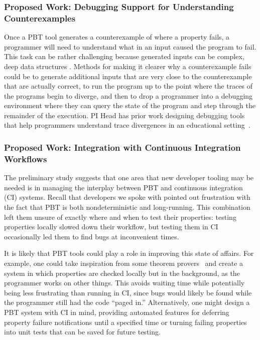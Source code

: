\subsubsection{Proposed Work: Debugging Support for Understanding Counterexamples}

Once a PBT tool generates a counterexample of where a property fails, a
programmer will need to understand what in an input caused the program to fail.
This task can be rather challenging because generated inputs can be complex,
deep data structures . Methods for making it clearer why a counterexample
fails could be to generate additional inputs that are very close to the
counterexample that are actually correct, to run the program up to the point
where the traces of the programs begin to diverge, and then to drop a programmer
into a debugging environment where they can query the state of the program and
step through the remainder of the execution. PI Head has prior work designing
debugging tools that help programmers understand trace divergences in an
educational setting~\cite{suzuki2017tracediff}.   

\subsubsection{Proposed Work: Integration with Continuous Integration Workflows}

The preliminary study suggests that one area that new developer tooling may be
needed is in managing the interplay between PBT and continuous integration (CI)
systems. Recall that developers we spoke with pointed out frustration with the
fact that PBT is both nondeterministic and long-running. This combination left
them unsure of exactly where and when to test their properties: testing
properties locally slowed down their workflow, but testing them in CI
occasionally led them to find bugs at inconvenient times.

It is likely that PBT tools could play a role in improving this state of
affairs. For example, one could take inspiration from some theorem
provers~\cite{berghofer2004random} and create a system in which properties are
checked locally but in the background, as the programmer works on other things.
This avoids waiting time while potentially being less frustrating than running
in CI, since bugs would likely be found while the programmer still had the code
``paged in.'' Alternatively, one might design a PBT system with CI in mind,
providing automated features for deferring property failure notifications until
a specified time or turning failing properties into unit tests that can be saved
for future testing.

